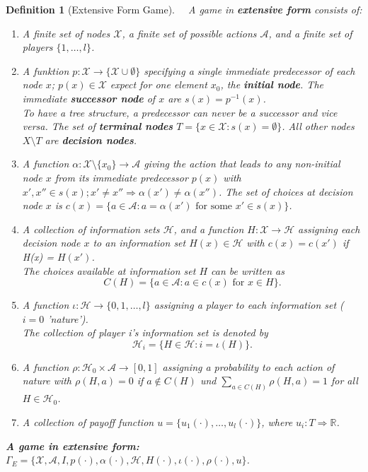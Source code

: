\documentclass[12pt]{extreport} %
\newcommand{\R}{\mathbb{R}}
\theoremstyle{named}
\theoremstyle{itshape}
\newtheorem*{definition}{Definition}
\theoremstyle{normal}
\begin{document}
\begin{definition}[Extensive Form Game] ~\
	A game in \textbf{extensive form} consists of:
	\begin{enumerate}[label=(\roman*\upshape)]
		\item A finite set of nodes $\mathcal{X}$, a finite set of possible actions $\mathcal{A}$, and a finite set of players $\{1, \dotsc, l\}$.
		\item A funktion $p \colon \mathcal{X} \rightarrow \{ \mathcal{X} \cup \emptyset \}$ specifying a single immediate predecessor of each node $x$; $p(x) \in \mathcal{X}$ expect for one element $x_{0}$, the \textbf{initial node}. The immediate \textbf{successor node} of $x$ are $s(x) = p^{-1}(x)$. ~\\
			To have a tree structure, a predecessor can never be a successor and vice versa. The set of \textbf{terminal nodes} $T = \{ x \in \mathcal{X} \colon s(x) = \emptyset \}$. All other nodes $X \setminus T$ are \textbf{decision nodes}.
		\item A function $\alpha \colon \mathcal{X} \setminus \{ x_{0} \} \rightarrow \mathcal{A}$ giving the action that leads to any non-initial node $x$ from its immediate predecessor $p(x)$ with $x', x'' \in s(x); x' \neq x'' \Rightarrow \alpha(x') \neq \alpha(x'')$. The set of choices at decision node $x$ is $c(x) = \{ a \in \mathcal{A} \colon a = \alpha(x') \text{ for some } x' \in s(x) \}$.
		\item A collection of information sets $\mathcal{H}$, and a function $H \colon \mathcal{X} \rightarrow \mathcal{H}$ assigning each decision node $x$ to an information set $H(x) \in \mathcal{H}$ with $c(x) = c(x')$ if H(x) = $H(x')$. ~\\
			The choices available at information set $H$ can be written as
			$$ C(H) = \{ a \in \mathcal{A} \colon a \in c(x) \text{ for } x \in H \}. $$
		\item A function $\iota \colon \mathcal{H} \rightarrow \{ 0, 1, \dotsc, l \}$ assigning a player to each information set ($i = 0$ 'nature'). ~\\
			The collection of player i's information set is denoted by
			$$ \mathcal{H}_i = \{ H \in \mathcal{H} \colon i = \iota(H) \}. $$
		\item A function $\rho \colon \mathcal{H}_0 \times \mathcal{A} \rightarrow [0,1]$ assigning a probability to each action of nature with $\rho(H,a) = 0$ if $a \notin C(H)$ und $\sum_{a \in C(H)} \rho(H, a) = 1$ for all $H \in \mathcal{H}_{0}$.
		\item A collection of payoff function $u = \{ u_1(\cdot), \dotsc, u_l(\cdot) \}$, where $u_i \colon T \Rightarrow \R$.
	\end{enumerate}
	\textbf{A game in extensive form:} $\Gamma_E = \{ \mathcal{X}, \mathcal{A}, I, p(\cdot), \alpha(\cdot), \mathcal{H}, H(\cdot), \iota(\cdot), \rho(\cdot), u \}$.
\end{definition}
\end{document}
